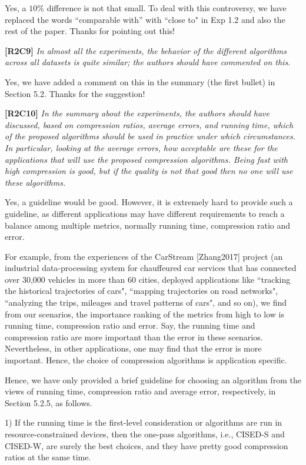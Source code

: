 \documentclass{letter}
\begin{document}
Yes, a $10\%$ difference is not that small. To deal with this controversy, we have replaced the words ``comparable with'' with ``close to" in Exp 1.2 and also the rest of the paper. Thanks for pointing out this!


\textbf{[R2C9]} \emph{In almost all the experiments, the behavior of the different algorithms across all datasets is quite similar; the authors should have commented on this.}

Yes, we have added a comment on this in the summary (the first bullet) in Section 5.2. Thanks for the suggestion!


\textbf{[R2C10]} \emph{In the summary about the experiments, the authors should have discussed, based on compression ratios, average errors, and running time, which of the proposed algorithms should be used in practice under which circumstances. In particular, looking at the average errors, how acceptable are these for the applications that will use the proposed compression algorithms. Being fast with high compression is good, but if the quality is not that good then no one will use these algorithms.}

Yes, a guideline would be good. However, it is extremely hard to provide such a  guideline, as different applications may have different requirements to reach a balance among multiple metrics, normally running time, compression ratio and  error.

For example, from the experiences of the CarStream [Zhang2017] project (an industrial data-processing system for chauffeured car services that has connected over 30,000 vehicles in more than 60 cities, deployed applications like ``tracking the historical trajectories of cars", ``mapping trajectories on road networks", ``analyzing the trips, mileages and travel patterns of cars", and so on), we find from our scenarios,  the importance ranking of the metrics from high to low is running time, compression ratio and error. Say, the running time and compression ratio are more important than the error in these scenarios.
Nevertheless, in other applications, one may find that the error is more important.
Hence, the choice of compression algorithms is application specific.

Hence, we have only provided a brief guideline for choosing an algorithm from the views of running time, compression ratio and average error, respectively, in Section 5.2.5, as follows.

1) If the running time is the first-level consideration
or algorithms are run in resource-constrained devices,
then the one-pass algorithms, i.e., CISED-S and CISED-W, are surely the best choices, and they have pretty
good compression ratios at the same time. %
\end{document}
